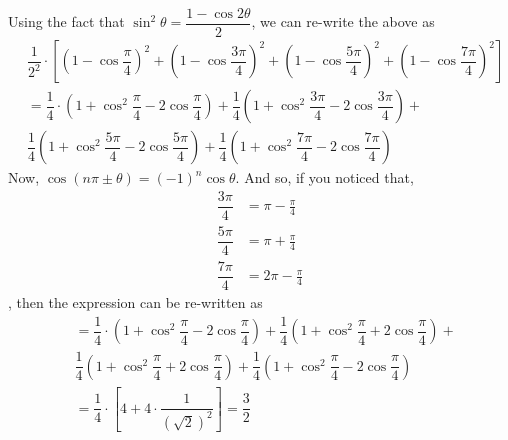 \begin{solution}[\fullpage]
  \begin{fullwidth}
    Using the fact that $\sin^2\theta = \dfrac{1-\cos 2\theta}{2}$,  we can re-write the above as
    \begin{align}
       &\dfrac{1}{2^2}\cdot\left[\left( 1-\cos\dfrac{\pi}{4}\right)^2 + 
       \left( 1-\cos\dfrac{3\pi}{4}\right)^2
       + \left( 1-\cos\dfrac{5\pi}{4}\right)^2 + 
       \left( 1-\cos\dfrac{7\pi}{4}\right)^2\right] \\
       &= \dfrac{1}{4}\cdot\left( 1 + \cos^2\dfrac{\pi}{4} - 2\cos\dfrac{\pi}{4}\right) +
          \dfrac{1}{4}\left( 1 + \cos^2\dfrac{3\pi}{4} - 2\cos\dfrac{3\pi}{4}\right) + \nonumber \\
       & \dfrac{1}{4}\left( 1 + \cos^2\dfrac{5\pi}{4} - 2\cos\dfrac{5\pi}{4}\right) + 
          \dfrac{1}{4}\left( 1 + \cos^2\dfrac{7\pi}{4} - 2\cos\dfrac{7\pi}{4}\right) 
    \end{align}
    Now, $\cos(n\pi \pm \theta) = (-1)^{n}\cos\theta$. And so, if you noticed that,
    \begin{align}
    	\dfrac{3\pi}{4} &= \pi - \frac{\pi}{4} \\
    	\dfrac{5\pi}{4} &= \pi + \frac{\pi}{4} \\
    	\dfrac{7\pi}{4} &= 2\pi - \frac{\pi}{4}
    \end{align}
    , then the expression can be re-written as 
    \begin{align}
       &= \dfrac{1}{4}\cdot\left( 1 + \cos^2\dfrac{\pi}{4} - 2\cos\dfrac{\pi}{4}\right) +
          \dfrac{1}{4}\left( 1 + \cos^2\dfrac{\pi}{4} + 2\cos\dfrac{\pi}{4}\right) + \nonumber \\
       & \dfrac{1}{4}\left( 1 + \cos^2\dfrac{\pi}{4} + 2\cos\dfrac{\pi}{4}\right) + 
          \dfrac{1}{4}\left( 1 + \cos^2\dfrac{\pi}{4} - 2\cos\dfrac{\pi}{4}\right) \\
       &= \dfrac{1}{4}\cdot\left[ 4 + 4\cdot\dfrac{1}{(\sqrt{2})^2}\right] = \dfrac{3}{2} 
    \end{align}
  \end{fullwidth}
\end{solution}
